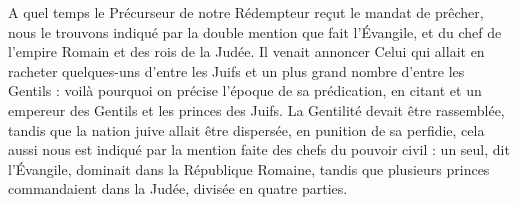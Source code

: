 A quel temps le Précurseur de notre Rédempteur reçut le mandat de prêcher, nous le trouvons indiqué par la double mention que fait l’Évangile, et du chef de l’empire Romain et des rois de la Judée. Il venait annoncer Celui qui allait en racheter quelques-uns d’entre les Juifs et un plus grand nombre d’entre les Gentils : voilà pourquoi on précise l’époque de sa prédication, en citant et un empereur des Gentils et les princes des Juifs. La Gentilité devait être rassemblée, tandis que la nation juive allait être dispersée, en punition de sa perfidie, cela aussi nous est indiqué par la mention faite des chefs du pouvoir civil : un seul, dit l’Évangile, dominait dans la République Romaine, tandis que plusieurs princes commandaient dans la Judée, divisée en quatre parties.